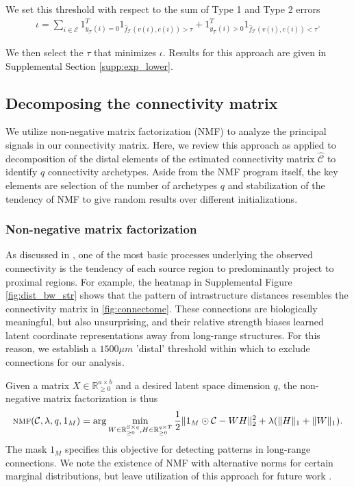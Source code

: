 We set this threshold with respect to the sum of Type 1 and Type 2 errors
\begin{eqnarray*}
\iota = \sum_{i \in \mathcal E} 1_{y_{\mathcal T}(i) = 0}^T 1_{\hat f_{\mathcal T}(v(i),c(i)) > \tau} + 1_{y_{\mathcal T}(i) > 0}^T 1_{\hat f_{\mathcal T}(v(i),c(i)) < \tau}  .
\end{eqnarray*}

We then select the $\tau$ that minimizes $\iota$.
Results for this approach are given in Supplemental Section \ref{supp:exp_lower}.

\newpage

\subsection{Decomposing the connectivity matrix}
\label{supp_sec:matrix_factor_methods}

We utilize non-negative matrix factorization (NMF) to analyze the principal signals in our connectivity matrix.
Here, we review this approach as applied to decomposition of the distal elements of the estimated connectivity matrix $\widehat {\mathcal C}$ to identify $q$ connectivity archetypes.
Aside from the NMF program itself, the key elements are selection of the number of archetypes $q$ and stabilization of the tendency of NMF to give random results over different initializations. 

\subsubsection{Non-negative matrix factorization}

As discussed in \citet{Knox2019-ot}, one of the most basic processes underlying the observed connectivity is the tendency of each source region to predominantly project to proximal regions.
For example, the heatmap in Supplemental Figure \ref{fig:dist_bw_str} shows that the pattern of intrastructure distances resembles the connectivity matrix in \ref{fig:connectome}.
These connections are biologically meaningful, but also unsurprising, and their relative strength biases learned latent coordinate representations away from long-range structures.
For this reason, we establish a $1500 \mu m$ 'distal' threshold within which to exclude connections for our analysis.

Given a matrix $X \in \mathbb R_{\geq 0}^{a \times b}$ and a desired latent space dimension $q$, the non-negative matrix factorization is thus
\begin{eqnarray*}
\textsc{nmf} (\mathcal C, \lambda, q,1_{M}) = \arg \min_{W \in \mathbb R_{\geq 0}^{S \times q}, H\in \mathbb R_{\geq 0}^{q \times T}} \frac{1}{2}\| 1_{M} \odot \mathcal C - WH\|_2^2  + \lambda  (\|H \|_1 + \|W \|_1) .
\end{eqnarray*}
The mask $1_M$ specifies this objective for detecting patterns in long-range connections.
We note the existence of NMF with alternative norms for certain marginal distributions, but leave utilization of this approach for future work \citep{Brunet2004-gi}.

